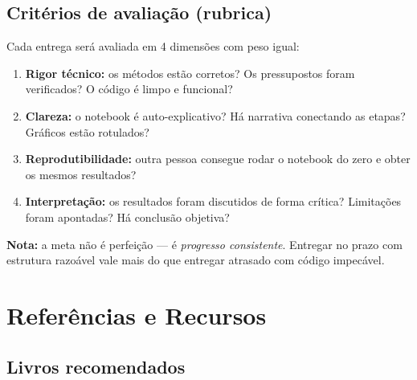 \documentclass[12pt,a4paper]{article}
\begin{document}
\subsection{Critérios de avaliação (rubrica)}

Cada entrega será avaliada em 4 dimensões com peso igual:

\begin{enumerate}[leftmargin=*]
    \item \textbf{Rigor técnico:} os métodos estão corretos? Os pressupostos foram verificados? O código é limpo e funcional?
    
    \item \textbf{Clareza:} o notebook é auto-explicativo? Há narrativa conectando as etapas? Gráficos estão rotulados?
    
    \item \textbf{Reprodutibilidade:} outra pessoa consegue rodar o notebook do zero e obter os mesmos resultados?
    
    \item \textbf{Interpretação:} os resultados foram discutidos de forma crítica? Limitações foram apontadas? Há conclusão objetiva?
\end{enumerate}

\textbf{Nota:} a meta não é perfeição — é \textit{progresso consistente}. Entregar no prazo com estrutura razoável vale mais do que entregar atrasado com código impecável.

\section{Referências e Recursos}

\subsection{Livros recomendados}
\end{document}
